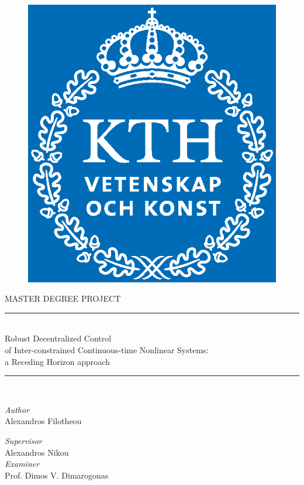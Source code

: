 \begin{titlepage}

\begin{figure}\centering
  \includegraphics[scale=0.25]{./figures/KTH_Logotyp_CMYK_2013.eps} \\[0.8cm]
\end{figure}



 \begin{center}
    \Large MASTER DEGREE PROJECT\\[0.8cm]

  \rule{350pt}{4pt} \\[0.3cm]
    \LARGE{Robust Decentralized Control \\ of
           Inter-constrained Continuous-time
           Nonlinear Systems: \\ a Receding Horizon approach} \\[0.3cm]
  \rule{350pt}{4pt} \\[2cm]

  \begin{minipage}{0.4\textwidth}
  \begin{flushleft} \large
  \emph{Author} \\
    Alexandros Filotheou
  \end{flushleft}
  \end{minipage}
  \begin{minipage}{0.4\textwidth}
  \begin{flushright} \large
  \emph{Supervisor} \\
    Alexandros Nikou \\
    \emph{Examiner} \\
    Prof. Dimos V. Dimarogonas
  \end{flushright}
  \end{minipage}
  \vfill


\end{center}
\end{titlepage}
